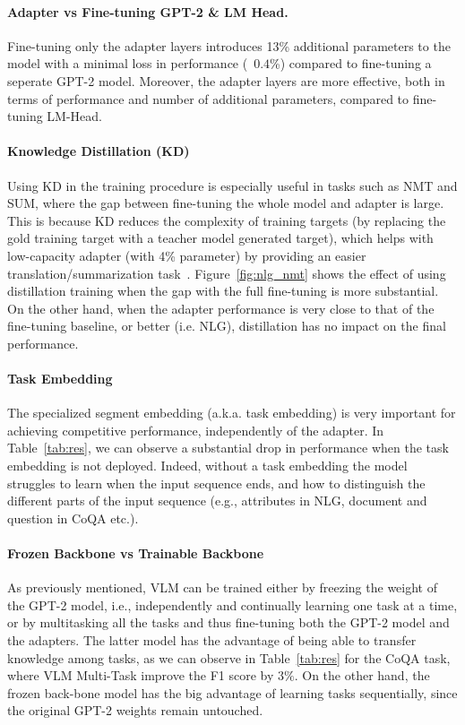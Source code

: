 \paragraph{Adapter vs Fine-tuning GPT-2 \& LM Head.} Fine-tuning only the adapter layers introduces 13\% additional parameters to the model with a minimal loss in performance (~$0.4$\%) compared to fine-tuning a seperate GPT-2 model. Moreover, the adapter layers are more effective, both in terms of performance and number of additional parameters, compared to fine-tuning LM-Head.

\paragraph{Knowledge Distillation (KD)} Using KD in the training procedure is especially useful in tasks such as NMT and SUM, where the gap between fine-tuning the whole model and adapter is large. This is because KD reduces the complexity of training targets (by replacing the gold training target with a teacher model generated target), which helps with low-capacity adapter (with 4\% parameter) by providing an easier translation/summarization task~\cite{zhou2019understanding}. Figure~\ref{fig:nlg_nmt} shows the effect of using distillation training when the gap with the full fine-tuning is more substantial. On the other hand, when the adapter performance is very close to that of the fine-tuning baseline, or better (i.e. NLG), distillation has no impact on the final performance. 

\paragraph{Task Embedding} The specialized segment embedding (a.k.a. task embedding) is very important for achieving competitive performance, independently of the adapter. In Table~\ref{tab:res}, we can observe a substantial drop in performance when the task embedding is not deployed. Indeed, without a task embedding the model struggles to learn when the input sequence ends, and how to distinguish the different parts of the input sequence (e.g., attributes in NLG, document and question in CoQA etc.).

\paragraph{Frozen Backbone vs Trainable Backbone} As previously mentioned, VLM can be trained either by freezing the weight of the GPT-2 model, i.e., independently and continually learning one task at a time, or by multitasking all the tasks and thus fine-tuning both the GPT-2 model and the adapters. The latter model has the advantage of being able to transfer knowledge among tasks, as we can observe in Table~\ref{tab:res} for the CoQA task, where VLM Multi-Task improve the F1 score by $3\%$. On the other hand, the frozen back-bone model has the big advantage of learning tasks sequentially, since the original GPT-2 weights remain untouched. 

